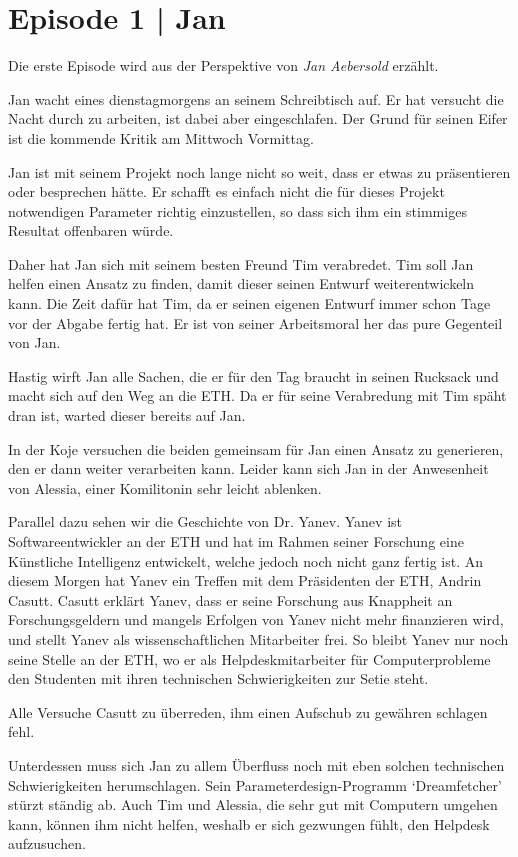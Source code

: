 \documentclass[11pt,a4paper,ngerman]{scrreprt}
\begin{document}
\section*{Episode 1 | Jan}

Die erste Episode wird aus der Perspektive von \emph{Jan Aebersold} erzählt.

Jan wacht eines dienstagmorgens an seinem Schreibtisch auf. Er hat versucht die
Nacht durch zu arbeiten, ist dabei aber eingeschlafen. Der Grund für seinen
Eifer ist die kommende Kritik am Mittwoch Vormittag.

Jan ist mit seinem Projekt noch lange nicht so weit, dass er etwas zu
präsentieren oder besprechen hätte. Er schafft es einfach nicht die für dieses
Projekt notwendigen Parameter richtig einzustellen, so dass sich ihm ein
stimmiges Resultat offenbaren würde.

Daher hat Jan sich mit seinem besten Freund Tim verabredet. Tim soll Jan helfen
einen Ansatz zu finden, damit dieser seinen Entwurf weiterentwickeln kann. Die
Zeit dafür hat Tim, da er seinen eigenen Entwurf immer schon Tage vor der Abgabe
fertig hat. Er ist von seiner Arbeitsmoral her das pure Gegenteil von Jan.

Hastig wirft Jan alle Sachen, die er für den Tag braucht in seinen Rucksack und
macht sich auf den Weg an die ETH. Da er für seine Verabredung mit Tim späht
dran ist, warted dieser bereits auf Jan.

In der Koje versuchen die beiden gemeinsam für Jan einen Ansatz zu generieren,
den er dann weiter verarbeiten kann. Leider kann sich Jan in der Anwesenheit von
Alessia, einer Komilitonin sehr leicht ablenken.

Parallel dazu sehen wir die Geschichte von Dr. Yanev. Yanev ist
Softwareentwickler an der ETH und hat im Rahmen seiner Forschung eine Künstliche
Intelligenz entwickelt, welche jedoch noch nicht ganz fertig ist. An diesem
Morgen hat Yanev ein Treffen mit dem Präsidenten der ETH, Andrin
Casutt. Casutt erklärt Yanev, dass er seine Forschung aus Knappheit an
Forschungsgeldern und mangels Erfolgen von Yanev nicht mehr finanzieren wird,
und stellt Yanev als wissenschaftlichen Mitarbeiter frei. So bleibt Yanev nur
noch seine Stelle an der ETH, wo er als Helpdeskmitarbeiter für Computerprobleme
den Studenten mit ihren technischen Schwierigkeiten zur Setie steht.

Alle Versuche Casutt zu überreden, ihm einen Aufschub zu gewähren schlagen
fehl.

Unterdessen muss sich Jan zu allem Überfluss noch mit eben solchen technischen
Schwierigkeiten herumschlagen. Sein Parameterdesign-Programm `Dreamfetcher'
stürzt ständig ab. Auch Tim und Alessia, die sehr gut mit Computern umgehen
kann, können ihm nicht helfen, weshalb er sich gezwungen fühlt, den Helpdesk
aufzusuchen.
\end{document}
